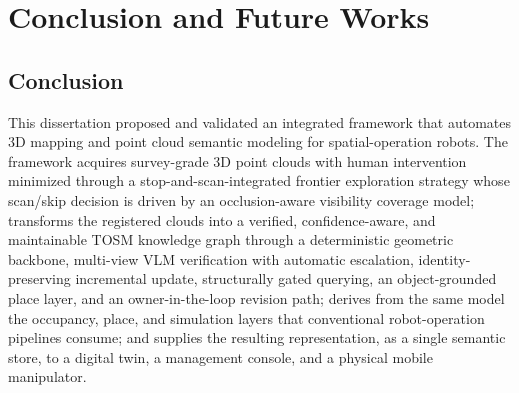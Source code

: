 \chapter{Conclusion and Future Works}
\label{ch:conclusion}

\section{Conclusion}
\label{sec:conclusion}

This dissertation proposed and validated an integrated framework that
automates 3D mapping and point cloud semantic modeling for spatial-operation
robots. The framework acquires survey-grade 3D point clouds with human
intervention minimized through a stop-and-scan-integrated frontier exploration
strategy whose scan/skip decision is driven by an occlusion-aware visibility
coverage model; transforms the registered clouds into a verified,
confidence-aware, and maintainable TOSM knowledge graph through a deterministic
geometric backbone, multi-view VLM verification with automatic escalation,
identity-preserving incremental update, structurally gated querying, an
object-grounded place layer, and an owner-in-the-loop revision path; derives
from the same model the occupancy, place, and simulation layers that
conventional robot-operation pipelines consume; and supplies the resulting
representation, as a single semantic store, to a digital twin, a management
console, and a physical mobile manipulator.

